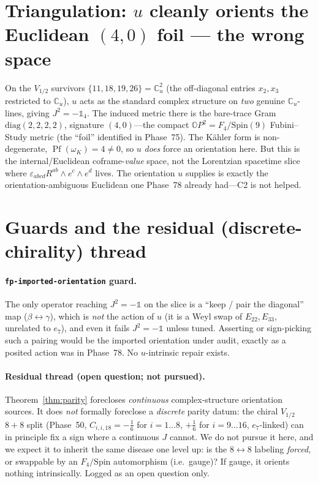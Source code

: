 \documentclass[11pt]{article}
\newcommand{\OO}{\mathbb{O}}
\newcommand{\Cu}{\mathbb{C}_u}
\newcommand{\id}{\mathbb{1}}
\DeclareMathOperator{\Pf}{Pf}
\theoremstyle{plain}\newtheorem{theorem}{Theorem}
\theoremstyle{plain}\newtheorem{proposition}{Proposition}
\theoremstyle{plain}\newtheorem{corollary}{Corollary}
\theoremstyle{definition}\newtheorem{remark}{Remark}
\begin{document}
\section{Triangulation: $u$ cleanly orients the Euclidean $(4,0)$ foil --- the wrong space}
On the $V_{1/2}$ survivors $\{11,18,19,26\}=\Cu^2$ (the off-diagonal entries $x_2,x_3$
restricted to $\Cu$), $u$ acts as the standard complex structure on \emph{two} genuine
$\Cu$-lines, giving $J^2=-\id_4$. The induced metric there is the bare-trace Gram
$\mathrm{diag}(2,2,2,2)$, signature $(4,0)$---the compact $\OO P^2=F_4/\mathrm{Spin}(9)$
Fubini--Study metric (the ``foil'' identified in Phase~75). The K\"ahler form is
non-degenerate, $\Pf(\omega_K)=4\neq0$, so $u$ \emph{does} force an orientation here. But
this is the internal/Euclidean coframe-\emph{value} space, not the Lorentzian spacetime
slice where $\varepsilon_{abcd}R^{ab}\wedge e^c\wedge e^d$ lives. The orientation $u$
supplies is exactly the orientation-ambiguous Euclidean one Phase~78 already had---C2 is not
helped.

\section{Guards and the residual (discrete-chirality) thread}
\paragraph{\texttt{fp-imported-orientation} guard.} The only operator reaching $J^2=-\id$
on the slice is a ``keep / pair the diagonal'' map ($\beta\leftrightarrow\gamma$), which is
\emph{not} the action of $u$ (it is a Weyl swap of $E_{22},E_{33}$, unrelated to $e_7$), and
even it fails $J^2=-\id$ unless tuned. Asserting or sign-picking such a pairing would be the
imported orientation under audit, exactly as a posited action was in Phase~78. No
$u$-intrinsic repair exists.

\paragraph{Residual thread (open question; not pursued).} Theorem~\ref{thm:parity} forecloses
\emph{continuous} complex-structure orientation sources. It does \emph{not} formally
foreclose a \emph{discrete} parity datum: the chiral $V_{1/2}$ $8+8$ split (Phase~50,
$C_{i,i,18}=-\tfrac16$ for $i=1\ldots8$, $+\tfrac16$ for $i=9\ldots16$, $e_7$-linked) can in
principle fix a sign where a continuous $J$ cannot. We do not pursue it here, and we expect it
to inherit the same disease one level up: is the $8\leftrightarrow8$ labeling \emph{forced},
or swappable by an $F_4/\mathrm{Spin}$ automorphism (i.e.\ gauge)? If gauge, it orients
nothing intrinsically. Logged as an open question only.
\end{document}
